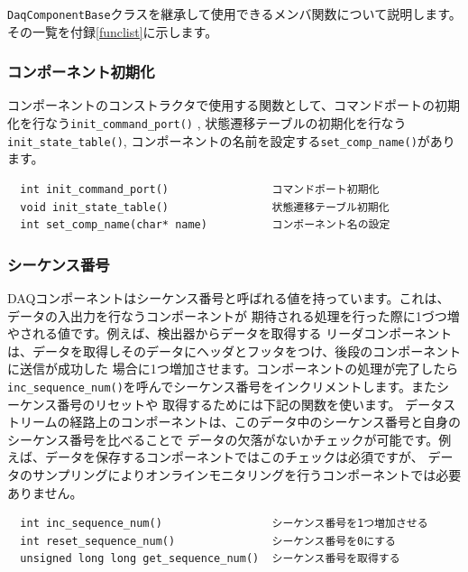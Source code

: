 \documentclass[a4j,10pt,dvips,onecolumn,oneside,final]{jarticle}%
\begin{document}
\verb|DaqComponentBase|クラスを継承して使用できるメンバ関数について説明します。
その一覧を付録\ref{funclist}に示します。


\subsubsection{コンポーネント初期化}\label{init}
コンポーネントのコンストラクタで使用する関数として、コマンドポートの初期化を行なう\verb|init_command_port()|
, 状態遷移テーブルの初期化を行なう\verb|init_state_table()|, コンポーネントの名前を設定する\verb|set_comp_name()|があります。
\begin{Verbatim}
  int init_command_port()                コマンドポート初期化
  void init_state_table()                状態遷移テーブル初期化
  int set_comp_name(char* name)          コンポーネント名の設定
\end{Verbatim}

\subsubsection{シーケンス番号}\label{seq}
DAQコンポーネントはシーケンス番号と呼ばれる値を持っています。これは、データの入出力を行なうコンポーネントが
期待される処理を行った際に1づつ増やされる値です。例えば、検出器からデータを取得する
リーダコンポーネントは、データを取得しそのデータにヘッダとフッタをつけ、後段のコンポーネントに送信が成功した
場合に1つ増加させます。コンポーネントの処理が完了したら
\verb|inc_sequence_num()|を呼んでシーケンス番号をインクリメントします。またシーケンス番号のリセットや
取得するためには下記の関数を使います。
データストリームの経路上のコンポーネントは、このデータ中のシーケンス番号と自身のシーケンス番号を比べることで
データの欠落がないかチェックが可能です。例えば、データを保存するコンポーネントではこのチェックは必須ですが、
データのサンプリングによりオンラインモニタリングを行うコンポーネントでは必要ありません。
\begin{Verbatim}
  int inc_sequence_num()                 シーケンス番号を1つ増加させる
  int reset_sequence_num()               シーケンス番号を0にする
  unsigned long long get_sequence_num()  シーケンス番号を取得する
\end{Verbatim}
\end{document}
